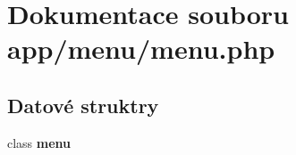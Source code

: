 \section{Dokumentace souboru app/menu/menu.php}
\label{df/daa/menu_8php}
\subsection*{Datové struktry}
\begin{DoxyCompactItemize}
\item 
class {\bf menu}
\end{DoxyCompactItemize}
